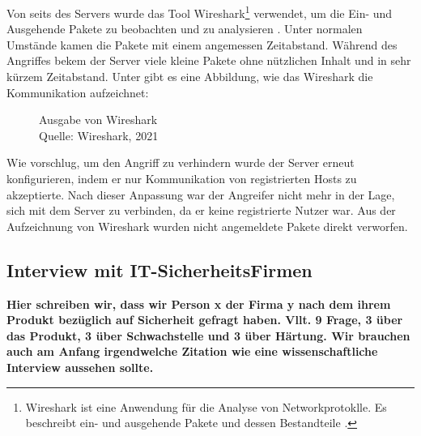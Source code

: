 Von seits des Servers wurde das Tool Wireshark\footnote{Wireshark ist eine Anwendung für die Analyse von Networkprotoklle.
Es beschreibt ein- und ausgehende Pakete und dessen Bestandteile \cite{refst:wisa}.} verwendet, um die Ein- und Ausgehende
Pakete zu beobachten und zu analysieren \cite{refart:UBEC}. Unter normalen Umstände kamen die Pakete mit einem angemessen
Zeitabstand. Während des Angriffes bekem der Server viele kleine Pakete ohne nützlichen Inhalt und in sehr kürzem Zeitabstand.
Unter gibt es eine Abbildung, wie das Wireshark die Kommunikation aufzeichnet:

\begin{figure}[H]
  \caption{Ausgabe von Wireshark \\Quelle: Wireshark, 2021}
  \label{fig:refst_wisa}
\end{figure}

Wie \cite{refip:NYRS} vorschlug, um den Angriff zu verhindern wurde der Server erneut konfigurieren, indem er nur
Kommunikation von registrierten Hosts zu akzeptierte. Nach dieser Anpassung war der Angreifer nicht mehr in der Lage, 
sich mit dem Server zu verbinden, da er keine registrierte Nutzer war. Aus der Aufzeichnung von Wireshark wurden nicht 
angemeldete Pakete direkt verworfen.

\subsection{Interview mit IT-SicherheitsFirmen}

\textbf{Hier schreiben wir, dass wir Person x der Firma y nach dem ihrem Produkt bezüglich auf Sicherheit gefragt haben.
Vllt. 9 Frage, 3 über das Produkt, 3 über Schwachstelle und 3 über Härtung. Wir brauchen auch am Anfang irgendwelche Zitation
wie eine wissenschaftliche Interview aussehen sollte.}

